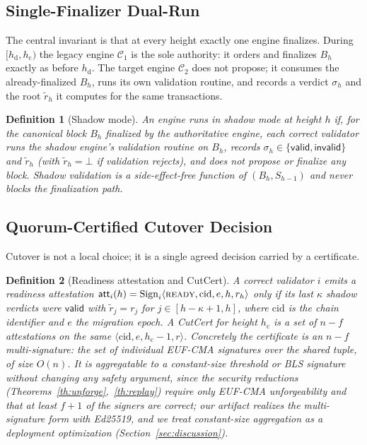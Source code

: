 \documentclass[journal]{IEEEtran}
\newtheorem{definition}{Definition}
\theoremstyle{remark}
\begin{document}
\subsection{Single-Finalizer Dual-Run}
The central invariant is that at every height exactly one engine finalizes. During
$[h_{\mathrm{d}}, h_{\mathrm{c}})$ the legacy engine $\mathcal{C}_1$ is the sole authority: it
orders and finalizes $B_h$ exactly as before $h_{\mathrm{d}}$. The target engine
$\mathcal{C}_2$ does not propose; it consumes the already-finalized $B_h$, runs its own
validation routine, and records a verdict $\sigma_h$ and the root $\tilde r_h$ it computes for
the same transactions.

\begin{definition}[Shadow mode]
\label{def:shadow}
An engine runs in shadow mode at height $h$ if, for the canonical block $B_h$ finalized by the
authoritative engine, each correct validator runs the shadow engine's validation routine on
$B_h$, records $\sigma_h \in \{\mathsf{valid},\mathsf{invalid}\}$ and $\tilde r_h$ (with
$\tilde r_h=\bot$ if validation rejects), and does not propose or finalize any block. Shadow
validation is a side-effect-free function of $(B_h,S_{h-1})$ and never blocks the finalization
path.
\end{definition}

\subsection{Quorum-Certified Cutover Decision}
Cutover is not a local choice; it is a single agreed decision carried by a certificate.

\begin{definition}[Readiness attestation and CutCert]
\label{def:cutcert}
A correct validator $i$ emits a readiness attestation $\mathsf{att}_i(h) = \mathrm{Sign}_i
\langle \textsc{ready}, \mathrm{cid}, e, h, r_h\rangle$ only if its last $\kappa$ shadow
verdicts were $\mathsf{valid}$ with $\tilde r_j = r_j$ for $j\in[h-\kappa+1,h]$, where
$\mathrm{cid}$ is the chain identifier and $e$ the migration epoch. A CutCert for height
$h_{\mathrm{c}}$ is a set of $n-f$ attestations on the same $\langle \mathrm{cid},e,h_{\mathrm{c}}-1,r\rangle$.
Concretely the certificate is an $n-f$ \emph{multi-signature}: the set of individual EUF-CMA
signatures over the shared tuple, of size $O(n)$. It is aggregatable to a constant-size threshold or
BLS signature without changing any safety argument, since the security reductions
(Theorems~\ref{th:unforge},~\ref{th:replay}) require only EUF-CMA unforgeability and that at least
$f{+}1$ of the signers are correct; our artifact realizes the multi-signature form with Ed25519, and
we treat constant-size aggregation as a deployment optimization (Section~\ref{sec:discussion}).
\end{definition}
\end{document}
